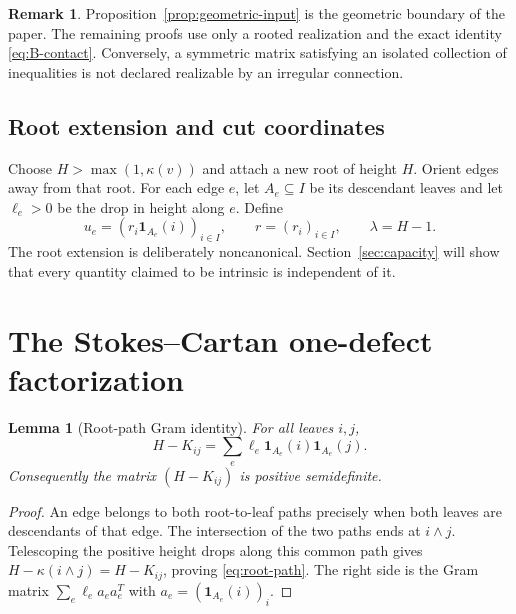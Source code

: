 \documentclass[11pt,a4paper]{amsart}
\theoremstyle{plain}
\newtheorem{lemma}[theorem]{Lemma}
\theoremstyle{definition}
\newtheorem{remark}[theorem]{Remark}
\newcommand{\one}{\mathbf 1}
\begin{document}
\begin{remark}
Proposition~\ref{prop:geometric-input} is the geometric boundary of the paper.  The remaining
proofs use only a rooted realization and the exact identity \eqref{eq:B-contact}.  Conversely, a
symmetric matrix satisfying an isolated collection of inequalities is not declared realizable by
an irregular connection.
\end{remark}

\subsection{Root extension and cut coordinates}

Choose $H>\max(1,\kappa(v))$ and attach a new root of height $H$.  Orient edges away from that
root.  For each edge $e$, let $A_e\subseteq I$ be its descendant leaves and let $\ell_e>0$ be the
drop in height along $e$.  Define
\begin{equation}\label{eq:cut-vectors}
 u_e=(r_i\one_{A_e}(i))_{i\in I},\qquad r=(r_i)_{i\in I},
 \qquad \lambda=H-1.
\end{equation}
The root extension is deliberately noncanonical.  Section~\ref{sec:capacity} will show that every
quantity claimed to be intrinsic is independent of it.

\section{The Stokes--Cartan one-defect factorization}\label{sec:factor}

\begin{lemma}[Root-path Gram identity]\label{lem:root-path}
For all leaves $i,j$,
\begin{equation}\label{eq:root-path}
 H-K_{ij}=\sum_e\ell_e\one_{A_e}(i)\one_{A_e}(j).
\end{equation}
Consequently the matrix $(H-K_{ij})$ is positive semidefinite.
\end{lemma}

\begin{proof}
An edge belongs to both root-to-leaf paths precisely when both leaves are descendants of that
edge.  The intersection of the two paths ends at $i\wedge j$.  Telescoping the positive height
drops along this common path gives $H-\kappa(i\wedge j)=H-K_{ij}$, proving
\eqref{eq:root-path}.  The right side is the Gram matrix
$\sum_e\ell_e a_ea_e^T$ with $a_e=(\one_{A_e}(i))_i$.
\end{proof}
\end{document}
